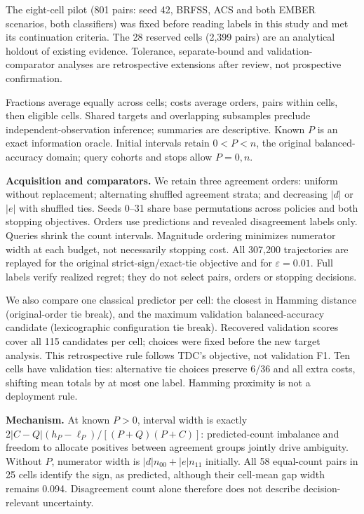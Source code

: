 \documentclass[a4paper]{esannV2}
\begin{document}
The eight-cell pilot (801 pairs: seed 42, BRFSS, ACS and both EMBER scenarios,
both classifiers) was fixed before reading labels in this study and met its
continuation criteria. The 28 reserved cells (2,399 pairs) are an analytical
holdout of existing evidence. Tolerance, separate-bound and validation-comparator analyses
are retrospective extensions after review, not prospective confirmation.

Fractions average equally across cells; costs average orders, pairs within
cells, then eligible cells. Shared targets and overlapping subsamples preclude
independent-observation inference; summaries are descriptive. Known $P$ is
an exact information oracle. Initial intervals retain $0<P<n$, the original
balanced-accuracy domain; query cohorts and stops allow $P=0,n$.

\textbf{Acquisition and comparators.} We retain three agreement orders:
uniform without replacement; alternating shuffled agreement strata; and
decreasing $|d|$ or $|e|$ with shuffled ties. Seeds 0--31 share base permutations
across policies and both stopping objectives. Orders use predictions and
revealed disagreement labels only. Queries shrink the count intervals. Magnitude ordering minimizes numerator
width at each budget, not necessarily stopping cost.
All 307,200 trajectories are replayed for the original strict-sign/exact-tie
objective and for $\varepsilon=0.01$. Full labels verify realized regret;
they do not select pairs, orders or stopping decisions.

We also compare one classical predictor per cell: the closest in Hamming
distance (original-order tie break), and the maximum validation
balanced-accuracy candidate (lexicographic configuration tie break).
Recovered validation scores cover all 115 candidates per cell; choices were
fixed before the new target analysis. This retrospective rule follows TDC's
objective, not validation F1. Ten cells have validation ties: alternative
tie choices preserve 6/36 and all extra costs, shifting mean totals by at most
one label. Hamming proximity is not a deployment rule.

\textbf{Mechanism.} At known $P>0$, interval width is exactly
$2|C-Q|(h_P-\ell_P)/[(P+Q)(P+C)]$: predicted-count imbalance and freedom to
allocate positives between agreement groups jointly drive ambiguity.
Without $P$, numerator width is $|d|n_{00}+|e|n_{11}$ initially.
All 58 equal-count pairs in 25 cells identify the sign, as predicted,
although their cell-mean gap width remains 0.094. Disagreement count alone
therefore does not describe decision-relevant uncertainty.
\end{document}
